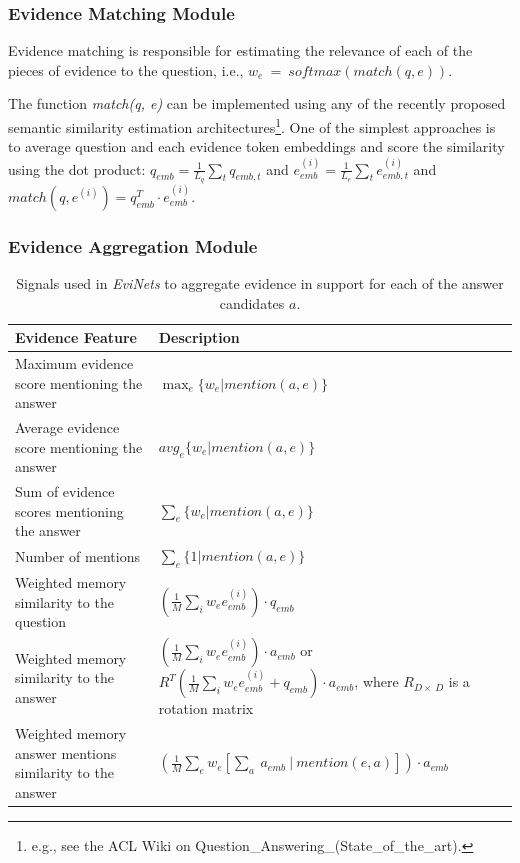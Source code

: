 \subsubsection{Evidence Matching Module}

Evidence matching is responsible for estimating the relevance of each of the pieces of evidence to the question, i.e., $w_e~=~softmax(match(q, e))$.

The function \textit{match(q, e)} can be implemented using any of the recently proposed semantic similarity estimation architectures\footnote{e.g., see the ACL Wiki on Question\_Answering\_(State\_of\_the\_art).}.
One of the simplest approaches is to average question and each evidence token embeddings and score the similarity using the dot product: $q_{emb} = \frac{1}{L_q}\sum_t q_{emb,t}$ and $e^{(i)}_{emb} = \frac{1}{L_e}\sum_t e^{(i)}_{emb,t}$ and $match(q, e^{(i)}) = q^T_{emb} \cdot e^{(i)}_{emb}$.

\subsubsection{Evidence Aggregation Module}

\begin{table}[h!]
\centering
\small
\begin{tabular}{p{6cm}|p{7cm}}
Evidence Feature & Description \\
\hline
Maximum evidence score mentioning the answer & $\max_e \{w_e | mention(a, e)\}$ \\
Average evidence score mentioning the answer & $avg_e \{w_e | mention(a, e)\}$ \\
Sum of evidence scores mentioning the answer & $\sum_e \{w_e | mention(a, e)\}$ \\
Number of mentions & $\sum_e \{1 | mention(a, e)\}$ \\
Weighted memory similarity to the question & $(\frac{1}{M}\sum_i w_e e^{(i)}_{emb})\cdot q_{emb}$\\
Weighted memory similarity to the answer~\cite{sukhbaatar2015end} & $(\frac{1}{M}\sum_i w_e e^{(i)}_{emb})\cdot a_{emb}$ or $R^T(\frac{1}{M}\sum_i w_e e^{(i)}_{emb} + q_{emb}) \cdot a_{emb}$, where $R_{D\times~D}$ is a rotation matrix \\
Weighted memory answer mentions similarity to the answer~\cite{miller2016key} & $(\frac{1}{M}\sum_e w_e [\sum_a~a_{emb}~|~mention(e, a)]) \cdot a_{emb}$ \\
\end{tabular}
\caption{Signals used in \textit{EviNets} to aggregate evidence in support for each of the answer candidates $a$.}
\label{table:factoid:evinet:aggregation}
\end{table}

